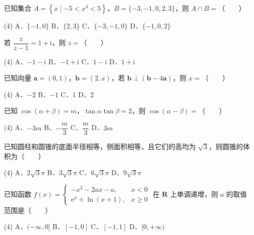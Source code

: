 \begin{question}
已知集合 $A=\left\{x\mid -5<x^{3}<5\right\}$，$B=\{-3,-1,0,2,3\}$，则 $A\cap B=$\mbox{（　　）}

\begin{gkopts}(4)
\task A．$\{-1,0\}$
\task B．$\{2,3\}$
\task C．$\{-3,-1,0\}$
\task D．$\{-1,0,2\}$
\end{gkopts}

\end{question}
\begin{question}
若 $\dfrac{z}{z-1}=1+\mathrm{i}$，则 $z=$\mbox{（　　）}

\begin{gkopts}(4)
\task A．$-1-\mathrm{i}$
\task B．$-1+\mathrm{i}$
\task C．$1-\mathrm{i}$
\task D．$1+\mathrm{i}$
\end{gkopts}

\end{question}
\begin{question}
已知向量 $\boldsymbol a=(0,1)$，$\boldsymbol b=(2,x)$，若 $\boldsymbol b\perp(\boldsymbol b-4\boldsymbol a)$，则 $x=$\mbox{（　　）}

\begin{gkopts}(4)
\task A．$-2$
\task B．$-1$
\task C．$1$
\task D．$2$
\end{gkopts}

\end{question}
\begin{question}
已知 $\cos(\alpha+\beta)=m$，$\tan\alpha\tan\beta=2$，则 $\cos(\alpha-\beta)=$\mbox{（　　）}

\begin{gkopts}(4)
\task A．$-3m$
\task B．$-\dfrac m3$
\task C．$\dfrac m3$
\task D．$3m$
\end{gkopts}

\end{question}
\begin{question}
已知圆柱和圆锥的底面半径相等，侧面积相等，且它们的高均为 $\sqrt3$，则圆锥的体积为\mbox{（　　）}

\begin{gkopts}(4)
\task A．$2\sqrt3\pi$
\task B．$3\sqrt3\pi$
\task C．$6\sqrt3\pi$
\task D．$9\sqrt3\pi$
\end{gkopts}

\end{question}
\begin{question}
已知函数 $f(x)=\begin{cases}-x^{2}-2ax-a,&x<0\\ \mathrm{e}^{x}+\ln(x+1),&x\ge0\end{cases}$ 在 $\mathbf R$ 上单调递增，则 $a$ 的取值范围是\mbox{（　　）}

\begin{gkopts}(4)
\task A．$(-\infty,0]$
\task B．$[-1,0]$
\task C．$[-1,1]$
\task D．$[0,+\infty)$
\end{gkopts}

\end{question}
